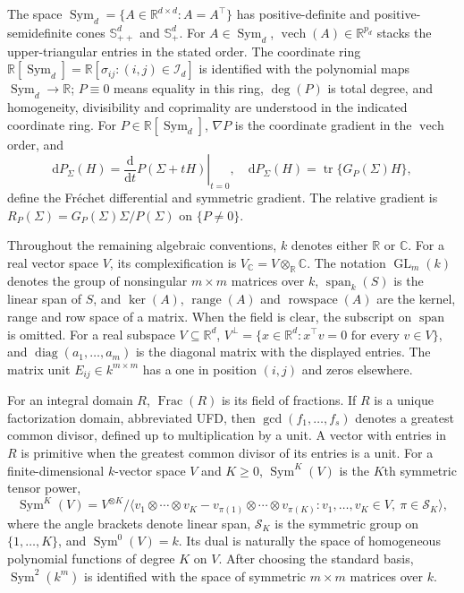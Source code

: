 \documentclass[12pt,a4paper]{article}
\theoremstyle{plain}
\theoremstyle{definition}
\newcommand{\C}{\mathbb{C}}
\newcommand{\R}{\mathbb{R}}
\newcommand{\Smat}{\mathbb{S}}
\newcommand{\Sym}{\operatorname{Sym}}
\newcommand{\tr}{\operatorname{tr}}
\newcommand{\vech}{\operatorname{vech}}
\newcommand{\Span}{\operatorname{span}}
\newcommand{\Range}{\operatorname{range}}
\newcommand{\rowspace}{\operatorname{rowspace}}
\newcommand{\diag}{\operatorname{diag}}
\begin{document}
The space $\Sym_d=\{A\in\R^{d\times d}:A=A^\top\}$ has positive-definite and positive-semidefinite cones $\Smat^d_{++}$ and $\Smat^d_+$.
For $A\in\Sym_d$, $\vech(A)\in\R^{p_d}$ stacks the upper-triangular entries in the stated order.
The coordinate ring $\R[\Sym_d]=\R[\sigma_{ij}:(i,j)\in\mathcal{I}_d]$ is identified with the polynomial maps $\Sym_d\to\R$;
$P\equiv0$ means equality in this ring, $\deg(P)$ is total degree, and homogeneity, divisibility and coprimality are understood in the indicated coordinate ring.
For $P\in\R[\Sym_d]$, $\nabla P$ is the coordinate gradient in the $\vech$ order, and
\begin{equation*}
    \mathrm{d}P_\Sigma(H)
    =
    \left.\frac{\mathrm{d}}{\mathrm{d}t}P(\Sigma+tH)\right|_{t=0},
    \quad
    \mathrm{d}P_\Sigma(H)
    =
    \tr\{G_P(\Sigma)H\}
    ,
\end{equation*}
define the Fr\'echet differential and symmetric gradient.
The relative gradient is $R_P(\Sigma)=G_P(\Sigma)\Sigma/P(\Sigma)$ on $\{P\ne0\}$.

Throughout the remaining algebraic conventions, $k$ denotes either $\R$ or $\C$.
For a real vector space $V$, its complexification is $V_\C=V\otimes_\R\C$.
The notation $\operatorname{GL}_m(k)$ denotes the group of nonsingular $m\times m$ matrices over $k$, $\Span_{k}(S)$ is the linear span of $S$, and $\ker(A)$, $\Range(A)$ and $\rowspace(A)$ are the kernel, range and row space of a matrix.
When the field is clear, the subscript on $\Span$ is omitted.
For a real subspace $V\subseteq\R^d$, $V^\perp=\{x\in\R^d:x^\top v=0\text{ for every }v\in V\}$, and $\diag(a_1,\ldots,a_m)$ is the diagonal matrix with the displayed entries.
The matrix unit $E_{ij}\in k^{m\times m}$ has a one in position $(i,j)$ and zeros elsewhere.

For an integral domain $R$, $\operatorname{Frac}(R)$ is its field of fractions.
If $R$ is a unique factorization domain, abbreviated UFD, then $\gcd(f_1,\ldots,f_s)$ denotes a greatest common divisor, defined up to multiplication by a unit.
A vector with entries in $R$ is primitive when the greatest common divisor of its entries is a unit.
For a finite-dimensional $k$-vector space $V$ and $K\ge0$, $\operatorname{Sym}^K(V)$ is the $K$th symmetric tensor power,
\begin{equation*}
    \operatorname{Sym}^K(V)
    =
    V^{\otimes K}/\langle v_1\otimes\cdots\otimes v_K
    -
    v_{\pi(1)}\otimes\cdots\otimes v_{\pi(K)}
    :
    v_1,\ldots,v_K\in V,\ \pi\in\mathcal{S}_K
    \rangle
    ,
\end{equation*}
where the angle brackets denote linear span, $\mathcal{S}_K$ is the symmetric group on $\{1,\ldots,K\}$, and $\operatorname{Sym}^0(V)=k$.
Its dual is naturally the space of homogeneous polynomial functions of degree $K$ on $V$.
After choosing the standard basis, $\operatorname{Sym}^2(k^m)$ is identified with the space of symmetric $m\times m$ matrices over $k$.
\end{document}
